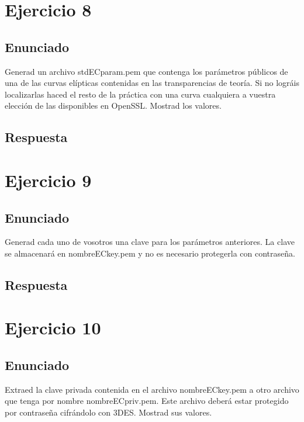 \documentclass[10pt,a4paper,spanish]{report}
\begin{document}
\chapter{Ejercicio 8}

\section{Enunciado}
\noindent
Generad un archivo stdECparam.pem que contenga los parámetros públicos de una de las curvas elípticas contenidas en las transparencias de teoría. Si no lográis localizarlas haced el resto de la práctica con una curva cualquiera a vuestra elección de las disponibles en OpenSSL. Mostrad los valores.

\section{Respuesta}
\noindent

\chapter{Ejercicio 9}

\section{Enunciado}
\noindent
Generad cada uno de vosotros una clave para los parámetros anteriores. La clave se almacenará en nombreECkey.pem y no es necesario protegerla con contraseña.

\section{Respuesta}
\noindent

\chapter{Ejercicio 10}

\section{Enunciado}
\noindent
Extraed la clave privada contenida en el archivo nombreECkey.pem a otro archivo que tenga por nombre nombreECpriv.pem. Este archivo deberá estar protegido por contraseña cifrándolo con 3DES. Mostrad sus valores.
\end{document}

